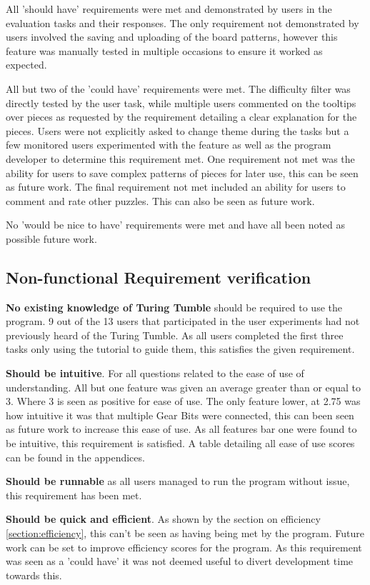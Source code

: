 \documentclass{l4proj}
\begin{document}
All 'should have' requirements were met and demonstrated by users in the evaluation tasks and their responses. The only requirement not demonstrated by users involved the saving and uploading of the board patterns, however this feature was manually tested in multiple occasions to ensure it worked as expected. 

All but two of the 'could have' requirements were met. The difficulty filter was directly tested by the user task, while multiple users commented on the tooltips over pieces as requested by the requirement detailing a clear explanation for the pieces. Users were not explicitly asked to change theme during the tasks but a few monitored users experimented with the feature as well as the program developer to determine this requirement met. One requirement not met was the ability for users to save complex patterns of pieces for later use, this can be seen as future work. The final requirement not met included an ability for users to comment and rate other puzzles. This can also be seen as future work. 

No 'would be nice to have' requirements were met and have all been noted as possible future work.

\subsection{Non-functional Requirement verification}
\textbf{No existing knowledge of Turing Tumble} should be required to use the program. 9 out of the 13 users that participated in the user experiments had not previously heard of the Turing Tumble. As all users completed the first three tasks only using the tutorial to guide them, this satisfies the given requirement.

\textbf{Should be intuitive}. For all questions related to the ease of use of understanding. All but one feature was given an average greater than or equal to 3. Where 3 is seen as positive for ease of use. The only feature lower, at 2.75 was how intuitive it was that multiple Gear Bits were connected, this can been seen as future work to increase this ease of use. As all features bar one were found to be intuitive, this requirement is satisfied. A table detailing all ease of use scores can be found in the appendices. 

\textbf{Should be runnable} as all users managed to run the program without issue, this requirement has been met.

\textbf{Should be quick and efficient}. As shown by the section on efficiency \ref{section:efficiency}, this can't be seen as having being met by the program. Future work can be set to improve efficiency scores for the program. As this requirement was seen as a 'could have' it was not deemed useful to divert development time towards this. 
\end{document}
